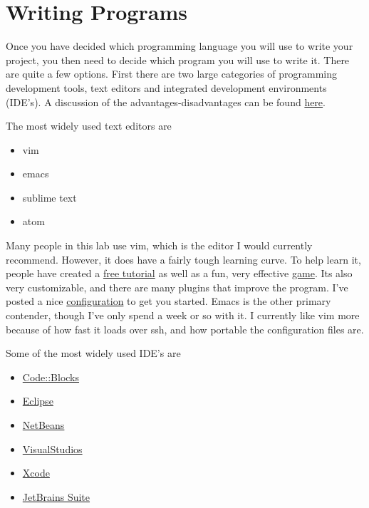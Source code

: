 \documentclass{article}
\begin{document}
\section*{Writing Programs}

Once you have decided which programming language you will use to write your project, you then need to decide which program you will use to write it.
There are quite a few options.
First there are two large categories of programming development tools, text editors and integrated development environments (IDE's).
A discussion of the advantages-disadvantages can be found \href{http://stackoverflow.com/questions/208193/why-should-i-use-an-ide}{here}.

The most widely used text editors are

\begin{itemize}
  \item{vim}
  \item{emacs}
  \item{sublime text}
  \item{atom}
\end{itemize}

Many people in this lab use vim, which is the editor I would currently recommend. 
However, it does have a fairly tough learning curve.
To help learn it, people have created a \href{http://www.openvim.com/}{free tutorial} as well as a fun, very effective \href{http://vim-adventures.com/}{game}.
Its also very customizable, and there are many plugins that improve the program.
I've posted a nice \href{https://github.com/PotentialParadox/User\_Configurations}{configuration} to get you started.
Emacs is the other primary contender, though I've only spend a week or so with it. 
I currently like vim more because of how fast it loads over ssh, and how portable the configuration files are.

Some of the most widely used IDE's are

\begin{itemize}
  \item{\href{http://www.codeblocks.org/}{Code::Blocks}}
  \item{\href{https://eclipse.org/downloads/}{Eclipse}}
  \item{\href{https://netbeans.org/}{NetBeans}}
  \item{\href{https://www.visualstudio.com/en-us/visual-studio-homepage-vs.aspx}{VisualStudios}}
  \item{\href{https://developer.apple.com/xcode/}{Xcode}}
  \item{\href{https://www.jetbrains.com/}{JetBrains Suite}}
\end{itemize}
\end{document}
